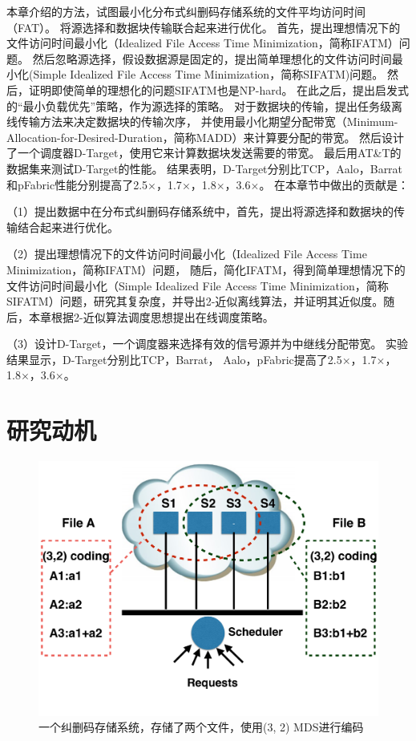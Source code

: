 本章介绍的方法，试图最小化分布式纠删码存储系统的文件平均访问时间（FAT）。
将源选择和数据块传输联合起来进行优化。
首先，提出理想情况下的文件访问时间最小化（Idealized File Access Time Minimization，简称IFATM）问题。
然后忽略源选择，假设数据源是固定的，提出简单理想化的文件访问时间最小化(Simple Idealized File Access Time Minimization，简称SIFATM)问题。
然后，证明即使简单的理想化的问题SIFATM也是NP-hard。
在此之后，提出启发式的“最小负载优先”策略，作为源选择的策略。
对于数据块的传输，提出任务级离线传输方法来决定数据块的传输次序，
并使用最小化期望分配带宽（Minimum-Allocation-for-Desired-Duration，简称MADD）来计算要分配的带宽。
然后设计了一个调度器D-Target，使用它来计算数据块发送需要的带宽。
最后用AT\&T的数据集来测试D-Target的性能。
结果表明，D-Target分别比TCP，Aalo\cite{chowdhury2015efficient}，Barrat\cite{dogar2014decentralized}和pFabric\cite{pFabric}性能分别提高了2.5$\times$，1.7$\times$，1.8$\times$，3.6$\times$。
在本章节中做出的贡献是：

（1）提出数据中在分布式纠删码存储系统中，首先，提出将源选择和数据块的传输结合起来进行优化。

（2）提出理想情况下的文件访问时间最小化（Idealized File Access Time Minimization，简称IFATM）问题，
随后，简化IFATM，得到简单理想情况下的文件访问时间最小化（Simple Idealized File Access Time Minimization，简称SIFATM）问题，研究其复杂度，并导出2-近似离线算法，并证明其近似度。随后，本章根据2-近似算法调度思想提出在线调度策略。

（3）设计D-Target，一个调度器来选择有效的信号源并为中继线分配带宽。
实验结果显示，D-Target分别比TCP，Barrat\cite{dogar2014decentralized}，
Aalo\cite{chowdhury2015efficient}，pFabric\cite{pFabric}提高了2.5$\times$，1.7$\times$，1.8$\times$，3.6$\times$。


\section{研究动机}
\label{erasure_coding:motivation}
\begin{figure}[b]
\begin{center}
\includegraphics [width=0.8\columnwidth] {figures/DTARGET/picture/motivation/motivation.pdf}
\caption{一个纠删码存储系统，存储了两个文件，使用(3, 2) MDS进行编码}
\label{erasure-motivation-fig}
\end{center}
\end{figure}

